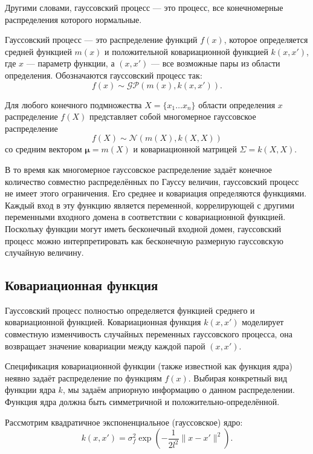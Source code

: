 \documentclass[11pt,a4paper]{article}
\begin{document}
Другими словами, гауссовский процесс --- это процесс, все конечномерные
распределения которого нормальные.

Гауссовский процесс --- это распределение функций \(f(x)\), которое
определяется средней функцией \(m(x)\) и положительной ковариационной
функцией \(k(x,x')\), где \(x\) --- параметр функции, а \((x,x')\) ---
все возможные пары из области определения. Обозначаются гауссовский
процесс так: \[
  f(x) \sim \mathcal{GP}(m(x), k(x,x')).
\]

    Для любого конечного подмножества \(X=\{x_1 \ldots x_n \}\) области
определения \(x\) распределение \(f(X)\) представляет собой многомерное
гауссовское распределение \[
  f(X) \sim \mathcal{N}(m(X), k(X, X))
\] со средним вектором \(\mathbf{\mu} = m(X)\) и ковариационной матрицей
\(\Sigma = k(X, X)\).

В то время как многомерное гауссовское распределение задаёт конечное
количество совместно распределённых по Гауссу величин, гауссовский
процесс не имеет этого ограничения. Его среднее и ковариация
определяются функциями. Каждый вход в эту функцию является переменной,
коррелирующей с другими переменными входного домена в соответствии с
ковариационной функцией. Поскольку функции могут иметь бесконечный
входной домен, гауссовский процесс можно интерпретировать как
бесконечную размерную гауссовскую случайную величину.

    \hypertarget{ux43aux43eux432ux430ux440ux438ux430ux446ux438ux43eux43dux43dux430ux44f-ux444ux443ux43dux43aux446ux438ux44f}{%
\subsection{Ковариационная
функция}\label{ux43aux43eux432ux430ux440ux438ux430ux446ux438ux43eux43dux43dux430ux44f-ux444ux443ux43dux43aux446ux438ux44f}}

Гауссовский процесс полностью определяется функцией среднего и
ковариационной функцией. Ковариационная функция \(k(x, x')\) моделирует
совместную изменчивость случайных переменных гауссовского процесса, она
возвращает значение ковариации между каждой парой \((x, x')\).

Спецификация ковариационной функции (также известной как функция ядра)
неявно задаёт распределение по функциям \(f(x)\). Выбирая конкретный вид
функции ядра \(k\), мы задаём априорную информацию о данном
распределении. Функция ядра должна быть симметричной и
положительно-определённой.

    Рассмотрим квадратичное экспоненциальное (гауссовское) ядро: \[
  k(x, x') = \sigma_f^2 \exp{ \left( -\frac{1}{2l^2} \lVert x - x' \rVert^2 \right) }.
\]
\end{document}
